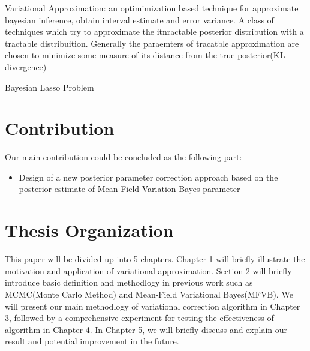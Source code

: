 Variational Approximation: an optimimization based technique for approximate bayesian inference, obtain interval estimate and error variance.
A class of techniques which try to approximate the itnractable posterior distribution with a tractable distribuition. Generally the paraemters of tracatble approximation are chosen to minimize some measure of its distance from the true posterior(KL-divergence)


Bayesian Lasso Problem





\section{Contribution}
Our main contribution could be concluded as the following part:
\begin{itemize}
	\item Design of a new posterior parameter correction approach based on the posterior estimate of Mean-Field Variation Bayes parameter 
\end{itemize}



\section{Thesis Organization}
This paper will be divided up into 5 chapters. Chapter 1 will briefly illustrate the motivation and application of variational approximation. Section 2 will briefly introduce basic definition and methodlogy in previous work such as MCMC(Monte Carlo Method) and Mean-Field Variational Bayes(MFVB). We will present our main methodlogy of variational correction algorithm in Chapter 3, followed by a comprehensive experiment for testing the effectiveness of algorithm in Chapter 4. In Chapter 5, we will briefly discuss and explain our result and potential improvement in the future. 



 